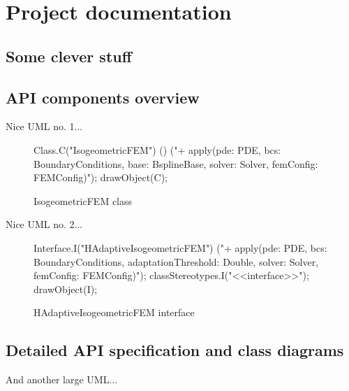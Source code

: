 
\chapter{Project documentation} \label{chap:docs}

\newcommand{\uml}[2] {
	\begin{figure}[H]
		\centering
		\caption{#1}
		\begin{mpost}[mpsettings=input metauml;]
			#2
		\end{mpost}
	\end{figure}
}

\bt

\section{Some clever stuff} \label{sec:cuda}

\bt

\section{API components overview} \label{sec:api-overview}

Nice UML no. 1...

\uml{IsogeometricFEM class} {
	Class.C("IsogeometricFEM") ()
		("+ apply(pde: PDE, bcs: BoundaryConditions,
			base: BsplineBase, solver: Solver, femConfig: FEMConfig)");
	drawObject(C);
}

Nice UML no. 2...

\uml{HAdaptiveIsogeometricFEM interface} {
	Interface.I("HAdaptiveIsogeometricFEM")
		("+ apply(pde: PDE, bcs: BoundaryConditions,
			adaptationThreshold: Double, solver: Solver, femConfig: FEMConfig)");
	classStereotypes.I("<<interface>>");
	drawObject(I);
}


\section{Detailed API specification and class diagrams} \label{sec:api-detail}

And another large UML...

